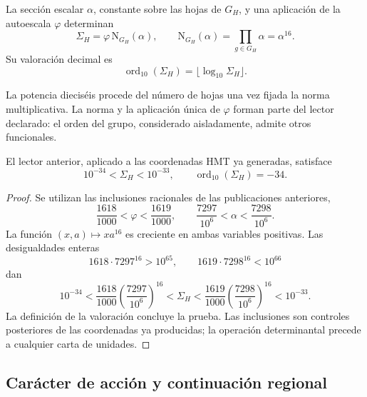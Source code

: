 \begin{definition}
\label{iv:action:norma}
La sección escalar \(\alpha\), constante sobre las hojas de \(G_H\),
y una aplicación de la autoescala \(\varphi\) determinan
\begin{equation}
 \Sigma_H=\varphi\,\mathrm N_{G_H}(\alpha),\qquad
 \mathrm N_{G_H}(\alpha)=\prod_{g\in G_H}\alpha=\alpha^{16}.
 \label{iv:action:sigma}
\end{equation}
Su valoración decimal es
\[
 \operatorname{ord}_{10}(\Sigma_H)
   =\lfloor\log_{10}\Sigma_H\rfloor.
\]
\end{definition}
La potencia dieciséis procede del número de hojas una vez fijada
la norma multiplicativa. La norma y la aplicación única de
\(\varphi\) forman parte del lector declarado: el orden del grupo,
considerado aisladamente, admite otros funcionales.

\begin{theorem}
\label{iv:action:decada}
El lector anterior, aplicado a las coordenadas HMT ya generadas,
satisface
\begin{equation}
 10^{-34}<\Sigma_H<10^{-33},
 \qquad \operatorname{ord}_{10}(\Sigma_H)=-34.
 \label{iv:action:orden-decimal}
\end{equation}
\end{theorem}
\begin{proof}
Se utilizan las inclusiones racionales de las publicaciones
anteriores,
\begin{equation}
 \frac{1618}{1000}<\varphi<\frac{1619}{1000},
 \qquad
 \frac{7297}{10^6}<\alpha<\frac{7298}{10^6}.
 \label{iv:action:intervalos}
\end{equation}
La función \((x,a)\mapsto xa^{16}\) es creciente en ambas
variables positivas. Las desigualdades enteras
\[
 1618\cdot7297^{16}>10^{65},
 \qquad 1619\cdot7298^{16}<10^{66}
\]
dan
\[
 10^{-34}
 <\frac{1618}{1000}\left(\frac{7297}{10^6}\right)^{16}
 <\Sigma_H
 <\frac{1619}{1000}\left(\frac{7298}{10^6}\right)^{16}
 <10^{-33}.
\]
La definición de la valoración concluye la prueba. Las inclusiones
son controles posteriores de las coordenadas ya producidas; la
operación determinantal precede a cualquier carta de unidades.
\end{proof}

\subsection{Carácter de acción y continuación regional}
\label{iv:action:caracter}

